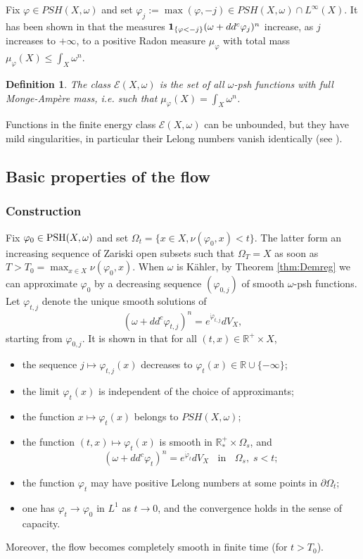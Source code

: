 \documentclass[11pt]{amsart}
\numberwithin{equation}{section}
\newtheorem{defi}[theorem]{Definition}
\newcommand{\PSH}{\textup{PSH}}
\newcommand{\R}{\mathbb R}
\newcommand{\f}{\varphi}
\begin{document}
Fix $\f \in PSH(X,\omega)$ and set $\f_j:=\max(\f,-j) \in PSH(X,\omega) \cap L^{\infty}(X)$.
It has been shown in \cite{GZ07} that the measures ${\bf 1}_{\{\f<-j\}} (\omega+dd^c \f_j)^n$
increase, as $j$ increases to $+\infty$, to a positive Radon measure 
$\mu_{\f}$ with total mass $\mu_{\f}(X) \leq \int_X \omega^n$.

\begin{defi}
The class $ \mathcal{E}(X,\omega)$ is the set of all $\omega$-psh functions with full Monge-Amp\`ere mass,
i.e. such that $\mu_{\f}(X) =\int_X \omega^n$.
\end{defi}

 
Functions in the finite energy class $\mathcal{E}(X,\omega)$ can be unbounded, but they have mild singularities, in particular
their Lelong numbers vanish identically (see \cite[Theorem 1.1]{DDL2}).
 



\subsection{Basic properties of the flow} \label{sec:construction}


\subsubsection*{Construction} 
Fix $\f_0 \in \PSH(X,\omega)$ and set $\Omega_t=\{x \in X, \nu(\f_0,x)<t \}$.
The latter form an increasing sequence of Zariski open subsets such that
$\Omega_T=X$ as soon as $T>T_0=\max_{x \in X} \nu(\f_0,x)$.
When $\omega$ is K\"ahler, by Theorem \ref{thm:Demreg} we can approximate $\f_0$ by a decreasing
sequence $(\f_{0,j})$ of smooth $\omega$-psh functions.
Let $\f_{t,j}$ denote the unique smooth solutions of 
$$
(\omega+dd^c \varphi_{t,j})^n = e^{\dot \varphi_{t,j}}dV_X,
$$
starting from   $\f_{0,j}$. It is shown in \cite{GZ17,DNL17} that
for all $(t,x) \in \R^+ \times X$, 
\begin{itemize}
\item the sequence  $j \mapsto \f_{t,j}(x)$ decreases to $\f_t(x) \in \R \cup \{-\infty\}$;
\item the limit $\f_t(x)$ is independent of the choice of approximants;
\item the function $x \mapsto \f_t(x)$ belongs to $PSH(X,\omega)$;
\item the function $(t,x) \mapsto \f_t(x)$ is smooth in $\R_*^+ \times \Omega_s$, and
$$
(\omega+dd^c \varphi_{t})^n = e^{\dot \varphi_{t}}dV_X
\; \; \text{ in } \; \;
\Omega_s, \; s<t;
$$
\item the function $\f_t$ may have positive Lelong numbers at some points in $\partial \Omega_t$;
\item one has $\f_t \rightarrow \f_0$ in $L^1$ as $t \rightarrow 0$,
and the convergence holds in the sense of capacity.
\end{itemize}
Moreover,  the flow becomes completely smooth  in finite time (for $t>T_0$).
\end{document}
